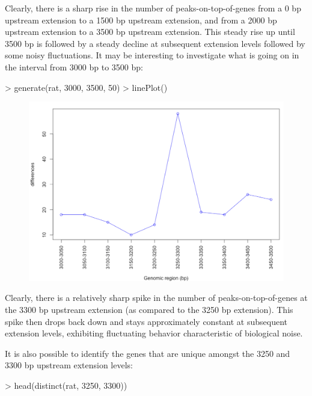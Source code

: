 \documentclass[12pt]{article}
\begin{document}
Clearly, there is a sharp rise in the number of peaks-on-top-of-genes from a 0 bp upstream extension to a 1500 bp upstream extension, and from a 2000 bp upstream extension to a 3500 bp upstream extension.  This steady rise up until 3500 bp is followed by a steady decline at subsequent extension levels followed by some noisy fluctuations.  It may be interesting to investigate what is going on in the interval from 3000 bp to 3500 bp: 

\begin{Schunk}
\begin{Sinput}
> generate(rat, 3000, 3500, 50)
> linePlot()
\end{Sinput}
\end{Schunk}

\begin{figure}[H]
\centering
\includegraphics{figures/fig3.png}
\end{figure}

Clearly, there is a relatively sharp spike in the number of peaks-on-top-of-genes at the 3300 bp upstream extension (as compared to the 3250 bp extension).  This spike then drops back down and stays approximately constant at subsequent extension levels, exhibiting fluctuating behavior characteristic of biological noise.  

It is also possible to identify the genes that are unique amongst the 3250 and 3300 bp upstream extension levels:

\begin{Schunk}
\begin{Sinput}
> head(distinct(rat, 3250, 3300))
\end{Sinput}
\end{Schunk}
\end{document}

